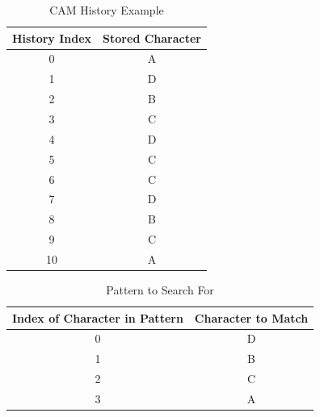 \documentclass[doublespace,nopageskip]{VTthesis}
\begin{document}
\begin{table}[htb]
	\centering
	\caption{CAM History Example}
	\begin{tabular}{cc}
	    \toprule
	    History Index & Stored Character\\
	    \midrule
	    0 & A \\
	    \midrule
	    1 & D \\
	    \midrule
	    2 & B \\
	    \midrule
	    3 & C \\
	    \midrule
	    4 & D \\
	    \midrule
	    5 & C \\
	    \midrule
	    6 & C \\
	    \midrule
	    7 & D \\
	    \midrule
	    8 & B \\
	    \midrule
	    9 & C \\
	    \midrule
	    10 & A \\
	    \bottomrule
	\end{tabular}
	\label{tab:cam_history_example}
\end{table}

\begin{table}[htb]
	\centering
	\caption{Pattern to Search For}
	\begin{tabular}{cc}
	    \toprule
	    Index of Character in Pattern & Character to Match\\
	    \midrule
	    0 & D \\
	    \midrule
	    1 & B \\
	    \midrule
	    2 & C \\
	    \midrule
	    3 & A \\
	    \bottomrule
	\end{tabular}
	\label{tab:pattern_search_example}
\end{table}
\end{document}
